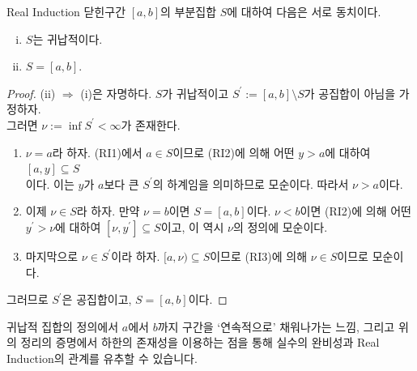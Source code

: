 \documentclass[serif]{beamer}
\begin{document}
\begin{frame}{}
    \begin{thm*}{Real Induction}
        닫힌구간 $[a,b]$의 부분집합 $S$에 대하여 다음은 서로 동치이다.
        \begin{enumerate}[(i)]
            \item $S$는 귀납적이다.
            \item $S=[a,b]$.
        \end{enumerate}
    \end{thm*}
    \begin{proof}
        (ii) $\Rightarrow$ (i)은 자명하다. $S$가 귀납적이고 $S^\prime:=[a,b]\setminus S$가 공집합이 아님을 가정하자. \\
        그러면 $\nu:=\inf S^\prime<\infty$가 존재한다.
        \begin{enumerate}[1.]
            \item $\nu=a$라 하자. (RI1)에서 $a\in S$이므로 (RI2)에 의해 어떤 $y>a$에 대하여 $[a,y]\subseteq S$\\이다.
                이는 $y$가 $a$보다 큰 $S^\prime$의 하계임을 의미하므로 모순이다. 따라서 $\nu>a$이다.
            \item 이제 $\nu\in S$라 하자. 만약 $\nu=b$이면 $S=[a,b]$이다. $\nu<b$이면 (RI2)에 의해 어떤 $y^\prime>\nu$에 대하여 $[\nu,y^\prime]\subseteq S$이고,
                이 역시 $\nu$의 정의에 모순이다.
            \item 마지막으로 $\nu\in S^\prime$이라 하자. $[a,\nu)\subseteq S$이므로 (RI3)에 의해 $\nu\in S$이므로 모순이다.
        \end{enumerate}
        그러므로 $S^\prime$은 공집합이고, $S=[a,b]$이다.
    \end{proof}
    귀납적 집합의 정의에서 $a$에서 $b$까지 구간을 `연속적으로' 채워나가는 느낌, 그리고 위의 정리의 증명에서 하한의 존재성을 이용하는 점을 통해
    실수의 완비성과 Real Induction의 관계를 유추할 수 있습니다.
\end{frame}
\end{document}
